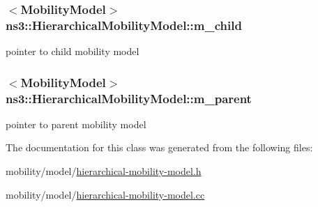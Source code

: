 \subsubsection[{\texorpdfstring{m\+\_\+child}{m_child}}]{$<${\bf Mobility\+Model}$>$ ns3\+::\+Hierarchical\+Mobility\+Model\+::m\+\_\+child\hspace{0.3cm}{\ttfamily [private]}}\hypertarget{classns3_1_1HierarchicalMobilityModel_a07ebcdb83ae4934089832879b1b2f6ca}{}\label{classns3_1_1HierarchicalMobilityModel_a07ebcdb83ae4934089832879b1b2f6ca}


pointer to child mobility model 

\subsubsection[{\texorpdfstring{m\+\_\+parent}{m_parent}}]{$<${\bf Mobility\+Model}$>$ ns3\+::\+Hierarchical\+Mobility\+Model\+::m\+\_\+parent\hspace{0.3cm}{\ttfamily [private]}}\hypertarget{classns3_1_1HierarchicalMobilityModel_a5fba1ec797033befe2d231649919d3e0}{}\label{classns3_1_1HierarchicalMobilityModel_a5fba1ec797033befe2d231649919d3e0}


pointer to parent mobility model 



The documentation for this class was generated from the following files\+:\begin{DoxyCompactItemize}
\item 
mobility/model/\hyperlink{hierarchical-mobility-model_8h}{hierarchical-\/mobility-\/model.\+h}\item 
mobility/model/\hyperlink{hierarchical-mobility-model_8cc}{hierarchical-\/mobility-\/model.\+cc}\end{DoxyCompactItemize}
